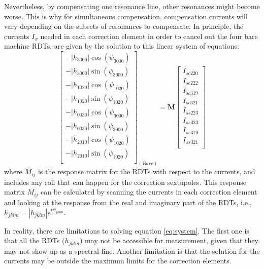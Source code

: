 Nevertheless, by compensating one resonance line, other resonances  might become worse. This is why for simultaneous compensation, compensation currents will vary depending on the subsets of resonances to compensate. In principle, the currents $I_x$ needed in each correction element in order to cancel out the four bare machine RDTs, are given by the solution to this linear system of equations: 
\begin{equation}
    \begin{bmatrix}
        -|{h_{3000}}|  \cos (\psi_{3000})\\
        -|{h_{3000}}|  \sin (\psi_{3000})\\
        -|{h_{1020}}|  \cos (\psi_{1020})\\
        -|{h_{1020}}|  \sin (\psi_{1020})\\
        -|{h_{0030}}|  \cos (\psi_{3000})\\
        -|{h_{0030}}|  \sin (\psi_{3000})\\
        -|{h_{2010}}|  \cos (\psi_{1020})\\
        -|{h_{2010}}|  \sin (\psi_{1020})\\
      \end{bmatrix}_{(Bare)}
    =
      \boldsymbol{M}
    \begin{bmatrix}
        I_{sc220} \\
        I_{sc222} \\
        I_{sc319} \\
        I_{sc321} \\
        I_{ss223} \\
        I_{ss323} \\
        I_{ss319} \\
        I_{ss321} \\
      \end{bmatrix}
    \label{eq:system}
\end{equation}
where $M_{ij}$ is the response matrix for the RDTs with respect to the currents, and includes any roll that can happen for the correction sextupoles. This response matrix $M_{ij}$ can be calculated by scanning the currents in each correction element and looking at the response from the real and imaginary part of the RDTs, i.e., $h_{jklm}=|h_{jklm}|e^{i\psi_{jklm}}$. 

In reality, there are limitations to solving equation \ref{eq:system}. The first one is that all the RDTs ($h_{jklm}$) may not be accessible for measurement, given that they may not show up as a spectral line.  Another limitation is that the solution for the currents may be outside the maximum limits for the correction elements. 

